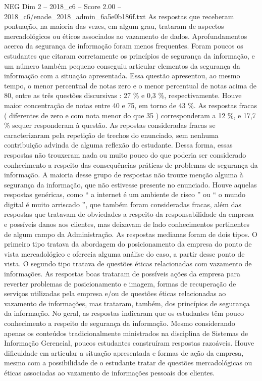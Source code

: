 \begin{textsample}{NEG Dim 2 – 2018\_c6 – Score 2.00 – 2018\_c6/enade\_2018\_admin\_6a5e0b186f.txt}
As respostas que receberam pontuação, na maioria das vezes, em algum grau, trataram de aspectos mercadológicos ou éticos associados ao vazamento de dados.
Aprofundamentos acerca da segurança de informação foram menos frequentes.
Foram poucos os estudantes que citaram corretamente os princípios de segurança da informação, e um número também pequeno conseguiu articular elementos da segurança da informação com a situação apresentada.
Essa questão apresentou, ao mesmo tempo, o menor percentual de notas zero e o menor percentual de notas acima de 80, entre as três questões discursivas : 27 \% e 0,3 \%, respectivamente.
Houve maior concentração de notas entre 40 e 75, em torno de 43 \%.
As respostas fracas ( diferentes de zero e com nota menor do que 35 ) corresponderam a 12 \%, e 17,7 \% sequer responderam à questão.
As repostas consideradas fracas se caracterizaram pela repetição de trechos do enunciado, sem nenhuma contribuição advinda de alguma reflexão do estudante.
Dessa forma, essas respostas não trouxeram nada ou muito pouco do que poderia ser considerado conhecimento a respeito das consequências práticas de problemas de segurança da informação.
A maioria desse grupo de respostas não trouxe menção alguma à segurança da informação, que não estivesse presente no enunciado.
Houve aquelas respostas genéricas, como “ a internet é um ambiente de risco ” ou “ o mundo digital é muito arriscado ”, que também foram consideradas fracas, além das respostas que tratavam de obviedades a respeito da responsabilidade da empresa e possíveis danos aos clientes, mas deixavam de lado conhecimentos pertinentes de algum campo da Administração.
As respostas medianas foram de dois tipos.
O primeiro tipo tratava da abordagem do posicionamento da empresa do ponto de vista mercadológico e oferecia alguma análise do caso, a partir desse ponto de vista.
O segundo tipo tratava de questões éticas relacionadas com vazamento de informações.
As respostas boas trataram de possíveis ações da empresa para reverter problemas de posicionamento e imagem, formas de recuperação de serviços utilizadas pela empresa e/ou de questões éticas relacionadas ao vazamento de informações, mas trataram, também, dos princípios de segurança da informação.
No geral, as respostas indicaram que os estudantes têm pouco conhecimento a respeito de segurança da informação.
Mesmo considerando apenas os conteúdos tradicionalmente ministrados na disciplina de Sistemas de Informação Gerencial, poucos estudantes construíram respostas razoáveis.
Houve dificuldade em articular a situação apresentada e formas de ação da empresa, mesmo com a possibilidade de o estudante tratar de questões mercadológicas ou éticas associadas ao vazamento de informações pessoais dos clientes.

\end{textsample}
